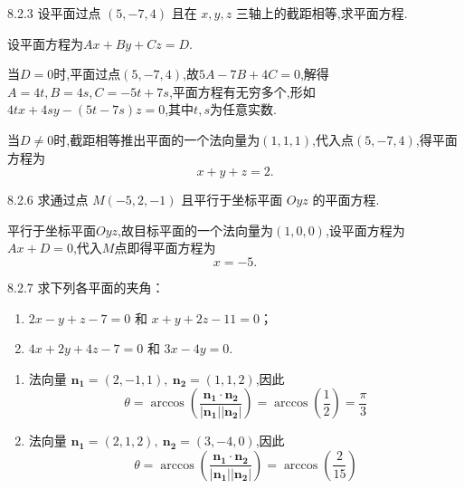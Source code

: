 \begin{exercise}{8.2.3}
    设平面过点 $(5, -7, 4)$ 且在 $x, y, z$ 三轴上的截距相等,求平面方程.
\end{exercise}

\begin{solution}
    设平面方程为$ Ax + By + Cz = D$.

    当$D = 0$时,平面过点$(5,-7,4)$,故$5A - 7B + 4C = 0$,解得$A =4t, B = 4s, C = -5t+7s$,平面方程有无穷多个,形如$4tx + 4sy - (5t - 7s)z = 0$,其中$t,s$为任意实数.

    当$D \neq 0 $时,截距相等推出平面的一个法向量为$(1,1,1)$,代入点$(5,-7,4)$,得平面方程为
    $$
    x + y + z = 2.
    $$
\end{solution}

\begin{exercise}{8.2.6}
    求通过点 $ M(-5, 2, -1) $ 且平行于坐标平面 $ Oyz $ 的平面方程.
\end{exercise}

\begin{solution}
    平行于坐标平面$Oyz$,故目标平面的一个法向量为$(1,0,0)$,设平面方程为$Ax+D=0$,代入$M$点即得平面方程为
    $$
    x = -5.
    $$
\end{solution}

\begin{exercise}{8.2.7}
    求下列各平面的夹角：
\begin{enumerate}
  \item $ 2x - y + z - 7 = 0 $ 和 $ x + y + 2z - 11 = 0 $；
  \item $ 4x + 2y + 4z - 7 = 0 $ 和 $ 3x - 4y = 0 $.
\end{enumerate}
\end{exercise}

\begin{solution}
    \begin{enumerate}
        \item 法向量 $ \mathbf{n_1} = (2, -1, 1), \ \mathbf{n_2} = (1, 1, 2) $,因此
        \[
        \theta = \arccos\left( \frac{\mathbf{n_1} \cdot \mathbf{n_2}}{|\mathbf{n_1}| |\mathbf{n_2}|} \right) = \arccos\left( \frac{1}{2} \right) = \frac{\pi}{3}
        \]
        \item 法向量 $ \mathbf{n_1} = (2, 1, 2), \ \mathbf{n_2} = (3, -4, 0) $,因此
        \[
        \theta = \arccos\left( \frac{\mathbf{n_1} \cdot \mathbf{n_2}}{|\mathbf{n_1}| |\mathbf{n_2}|} \right) = \arccos\left( \frac{2}{15} \right)
        \]
    \end{enumerate}
\end{solution}

